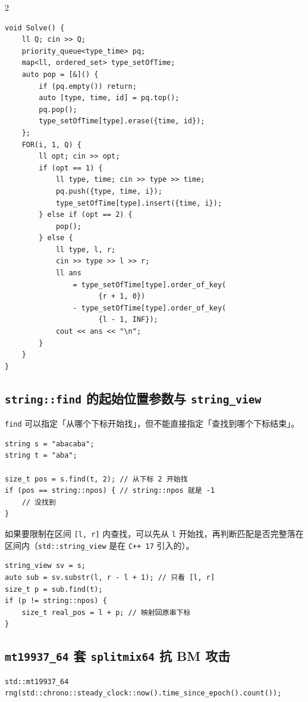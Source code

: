 \begin{multicols*}{2}
\begin{verbatim}
void Solve() {
    ll Q; cin >> Q;
    priority_queue<type_time> pq;
    map<ll, ordered_set> type_setOfTime;
    auto pop = [&]() {
        if (pq.empty()) return;
        auto [type, time, id] = pq.top();
        pq.pop();
        type_setOfTime[type].erase({time, id});
    };
    FOR(i, 1, Q) {
        ll opt; cin >> opt;
        if (opt == 1) {
            ll type, time; cin >> type >> time;
            pq.push({type, time, i});
            type_setOfTime[type].insert({time, i});
        } else if (opt == 2) {
            pop();
        } else {
            ll type, l, r;
            cin >> type >> l >> r;
            ll ans
                = type_setOfTime[type].order_of_key(
                      {r + 1, 0})
                - type_setOfTime[type].order_of_key(
                      {l - 1, INF});
            cout << ans << "\n";
        }
    }
}
		\end{verbatim}

		\subsection{\texttt{string::find} 的起始位置参数与 \texttt{string\_view}}
		\texttt{find} 可以指定「从哪个下标开始找」，但不能直接指定「查找到哪个下标结束」。

		\begin{verbatim}
string s = "abacaba";
string t = "aba";

size_t pos = s.find(t, 2); // 从下标 2 开始找
if (pos == string::npos) { // string::npos 就是 -1
	// 没找到
}
		\end{verbatim}

		如果要限制在区间 \verb|[l, r]| 内查找，可以先从 \verb|l| 开始找，再判断匹配是否完整落在区间内（\verb|std::string_view| 是在 \verb|C++ 17| 引入的）。

		\begin{verbatim}
string_view sv = s;
auto sub = sv.substr(l, r - l + 1); // 只看 [l, r]
size_t p = sub.find(t);
if (p != string::npos) {
	size_t real_pos = l + p; // 映射回原串下标
}
		\end{verbatim}

		\subsection[\tochl{\texttt{mt19937\_64} 套 \texttt{splitmix64} 抗 BM 攻击}]{\texttt{mt19937\_64} 套 \texttt{splitmix64} 抗 BM 攻击}

		\begin{verbatim}
std::mt19937_64 rng(std::chrono::steady_clock::now().time_since_epoch().count());


\end{verbatim}
\end{multicols*}
